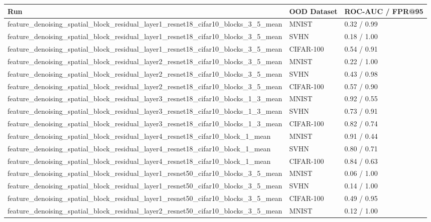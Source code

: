 \begin{tabular}{lll}
\toprule
Run & OOD Dataset & ROC-AUC / FPR@95 \\
\midrule
feature\_denoising\_spatial\_block\_residual\_layer1\_resnet18\_cifar10\_blocks\_3\_5\_mean & MNIST & 0.32 / 0.99 \\
feature\_denoising\_spatial\_block\_residual\_layer1\_resnet18\_cifar10\_blocks\_3\_5\_mean & SVHN & 0.18 / 1.00 \\
feature\_denoising\_spatial\_block\_residual\_layer1\_resnet18\_cifar10\_blocks\_3\_5\_mean & CIFAR-100 & 0.54 / 0.91 \\
feature\_denoising\_spatial\_block\_residual\_layer2\_resnet18\_cifar10\_blocks\_3\_5\_mean & MNIST & 0.22 / 1.00 \\
feature\_denoising\_spatial\_block\_residual\_layer2\_resnet18\_cifar10\_blocks\_3\_5\_mean & SVHN & 0.43 / 0.98 \\
feature\_denoising\_spatial\_block\_residual\_layer2\_resnet18\_cifar10\_blocks\_3\_5\_mean & CIFAR-100 & 0.57 / 0.90 \\
feature\_denoising\_spatial\_block\_residual\_layer3\_resnet18\_cifar10\_blocks\_1\_3\_mean & MNIST & 0.92 / 0.55 \\
feature\_denoising\_spatial\_block\_residual\_layer3\_resnet18\_cifar10\_blocks\_1\_3\_mean & SVHN & 0.73 / 0.91 \\
feature\_denoising\_spatial\_block\_residual\_layer3\_resnet18\_cifar10\_blocks\_1\_3\_mean & CIFAR-100 & 0.82 / 0.74 \\
feature\_denoising\_spatial\_block\_residual\_layer4\_resnet18\_cifar10\_block\_1\_mean & MNIST & 0.91 / 0.44 \\
feature\_denoising\_spatial\_block\_residual\_layer4\_resnet18\_cifar10\_block\_1\_mean & SVHN & 0.80 / 0.71 \\
feature\_denoising\_spatial\_block\_residual\_layer4\_resnet18\_cifar10\_block\_1\_mean & CIFAR-100 & 0.84 / 0.63 \\
feature\_denoising\_spatial\_block\_residual\_layer1\_resnet50\_cifar10\_blocks\_3\_5\_mean & MNIST & 0.06 / 1.00 \\
feature\_denoising\_spatial\_block\_residual\_layer1\_resnet50\_cifar10\_blocks\_3\_5\_mean & SVHN & 0.14 / 1.00 \\
feature\_denoising\_spatial\_block\_residual\_layer1\_resnet50\_cifar10\_blocks\_3\_5\_mean & CIFAR-100 & 0.49 / 0.95 \\
feature\_denoising\_spatial\_block\_residual\_layer2\_resnet50\_cifar10\_blocks\_3\_5\_mean & MNIST & 0.12 / 1.00 \\

\end{tabular}
